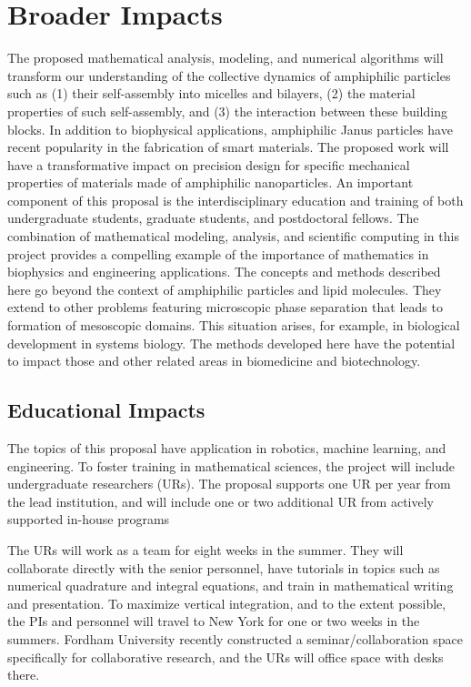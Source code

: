 \section{Broader Impacts}
\label{sec:BroaderImpacts}

The proposed mathematical analysis, modeling, and numerical algorithms
will transform our understanding of the collective dynamics of
amphiphilic particles such as (1) their self-assembly into micelles and
bilayers, (2) the material properties of such self-assembly, and (3) the
interaction between these building blocks. In addition to biophysical
applications, amphiphilic Janus particles have recent popularity in the
fabrication of smart materials. The proposed work will have a
transformative impact on precision design for specific mechanical
properties of materials made of amphiphilic nanoparticles. An important
component of this proposal is the interdisciplinary education and
training of both undergraduate students, graduate students, and
postdoctoral fellows. The combination of mathematical modeling,
analysis, and scientific computing in this project provides a compelling
example of the importance of mathematics in biophysics and engineering
applications. The concepts and methods described here go beyond the
context of amphiphilic particles and lipid molecules. They extend to
other problems featuring microscopic phase separation that leads to
formation of mesoscopic domains. This situation arises, for example, in
biological development in systems biology. The methods developed here
have the potential to impact those and other related areas in
biomedicine and biotechnology.

\subsection{Educational Impacts}
\label{subsec:Educational_plans}
The topics of this proposal have application in robotics, machine learning,
and engineering. To foster training in mathematical sciences, the project
will include undergraduate researchers (URs). The proposal supports one UR
per year from the lead institution, and will include one or two additional
UR from actively supported in-house programs

The URs will work as a team for eight weeks in the summer. They will
collaborate directly with the senior personnel, have tutorials in topics
such as numerical quadrature and integral equations, and train in
mathematical writing and presentation. To maximize vertical integration,
and to the extent possible, the PIs and personnel will travel to 
New York for one or two weeks in the summers. Fordham University 
recently constructed a seminar/collaboration space specifically
for collaborative research, and the URs will office space with desks
there.

